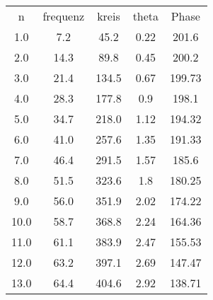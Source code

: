 \begin{table}
\begin{tabular}{ccccc}
n & frequenz & kreis & theta & Phase \\
1.0 & 7.2 & 45.2 & 0.22 & 201.6 \\
2.0 & 14.3 & 89.8 & 0.45 & 200.2 \\
3.0 & 21.4 & 134.5 & 0.67 & 199.73 \\
4.0 & 28.3 & 177.8 & 0.9 & 198.1 \\
5.0 & 34.7 & 218.0 & 1.12 & 194.32 \\
6.0 & 41.0 & 257.6 & 1.35 & 191.33 \\
7.0 & 46.4 & 291.5 & 1.57 & 185.6 \\
8.0 & 51.5 & 323.6 & 1.8 & 180.25 \\
9.0 & 56.0 & 351.9 & 2.02 & 174.22 \\
10.0 & 58.7 & 368.8 & 2.24 & 164.36 \\
11.0 & 61.1 & 383.9 & 2.47 & 155.53 \\
12.0 & 63.2 & 397.1 & 2.69 & 147.47 \\
13.0 & 64.4 & 404.6 & 2.92 & 138.71 \\
\end{tabular}
\end{table}
